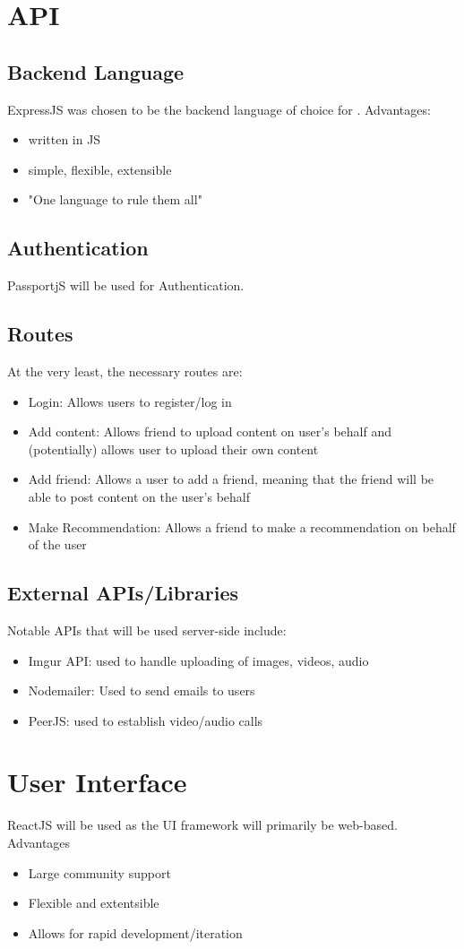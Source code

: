 \section{API}
\subsection{Backend Language}
ExpressJS was chosen to be the backend language of choice for \serviceName. 
Advantages:
\begin{itemize}
    \item written in JS
    \item simple, flexible, extensible
    \item "One language to rule them all"
\end{itemize}

\subsection{Authentication}
PassportjS will be used for Authentication.

\subsection{Routes}
At the very least, the necessary routes are:
\begin{itemize}
    \item Login: Allows users to register/log in
    \item Add content: Allows friend to upload content on user's behalf and (potentially) allows user to upload their own content
    \item Add friend: Allows a user to add a friend, meaning that the friend will be able to post content on the user's behalf
    \item Make Recommendation: Allows a friend to make a recommendation on behalf of the user
\end{itemize}


\subsection{External APIs/Libraries}
Notable APIs that will be used server-side include:
\begin{itemize}
    \item Imgur API: used to handle uploading of images, videos, audio
    \item Nodemailer: Used to send emails to users
    \item PeerJS: used to establish video/audio calls
\end{itemize}


\section{User Interface}
ReactJS will be used as the UI framework \serviceName will primarily be web-based. 
Advantages
\begin{itemize}
    \item Large community support
    \item Flexible and extentsible
    \item Allows for rapid development/iteration
\end{itemize}
